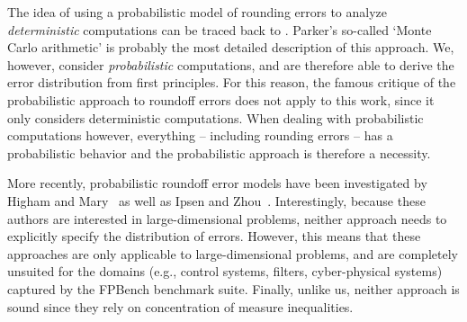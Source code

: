 %
The idea of using a probabilistic model of rounding errors to analyze \emph{deterministic} computations can be traced back to \cite{von1947numerical}.  Parker's so-called `Monte Carlo arithmetic' \cite{parker2000monte} is probably the most detailed description of this approach.  We, however,  consider \emph{probabilistic} computations,  and are therefore able to derive the error distribution from first principles.
For this reason, the famous critique of the probabilistic approach to roundoff errors \cite{kahan1996improbability} does not apply to this work, since it only considers deterministic computations.  When dealing with probabilistic computations however, everything -- including rounding errors -- has a probabilistic behavior and the probabilistic approach is therefore a  necessity.  



More recently, probabilistic roundoff error models have been investigated by Higham and Mary~\cite{higham2019new} as well as Ipsen and Zhou~\cite{ipsen2019probabilistic}. Interestingly, because these authors are interested in large-dimensional problems, neither approach needs to explicitly specify the distribution of errors.  However, this means that these approaches are only applicable to large-dimensional problems, and are completely unsuited for the domains (e.g., control systems, filters, cyber-physical systems)  captured by the FPBench benchmark suite. Finally, unlike us, neither approach is sound since they rely on concentration of measure inequalities.

